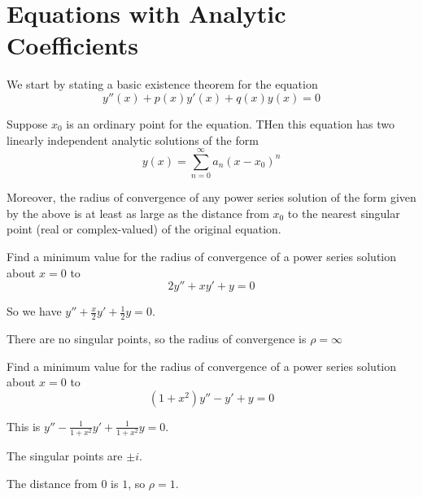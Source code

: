 \documentclass[../diffeq.tex]{subfiles}
\begin{document}
\section{Equations with Analytic Coefficients}
We start by stating a basic existence theorem for the equation 
\[ y''(x)+p(x)y'(x)+q(x)y(x)=0\]

\begin{theorem}
    Suppose $x_0$ is an ordinary point for the equation. THen this equation has two linearly independent analytic solutions of the form 
    \[ y(x)=\sum_{n=0}^{\infty}a_n(x-x_0)^n \]

    Moreover, the radius of convergence of any power series solution of the form given by the above is at least as large as the distance from $x_0$ to the nearest singular point (real or complex-valued) of the original equation.
\end{theorem}

\begin{example}
    Find a minimum value for the radius of convergence of a power series solution about $x=0$ to 
    \[ 2y''+xy'+y=0 \]

    So we have $y''+\frac{x}{2}y'+\frac{1}{2}y=0$.

    There are no singular points, so the radius of convergence is $\rho = \infty$
\end{example}
\pagebreak
\begin{example}
    Find a minimum value for the radius of convergence of a power series solution about $x=0$ to 
    \[ (1+x^2)y''-y'+y=0 \]

    This is $y''-\frac{1}{1+x^2}y'+\frac{1}{1+x^2}y=0$.

    The singular points are $\pm i$.

    The distance from $0$ is $1$, so $\rho = 1$.
\end{example}
\end{document}
